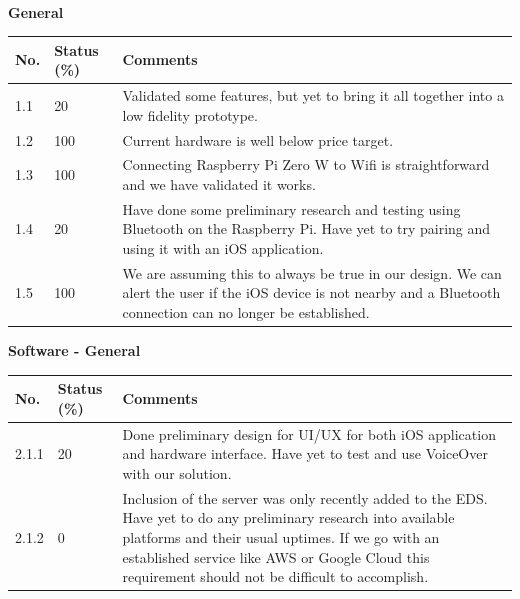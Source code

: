 \documentclass[a4paper,11pt]{article}
\begin{document}
\

\noindent
\textbf{General}
\begin{table}[ht]
    \centering
    \begin{tabular}{|p{0.7cm}|p{1cm}|p{10cm}|}
        \hline
        No. & Status (\%) & Comments \\ \hline
        
        1.1 & 20 & Validated some features, but yet to bring it all together into a low fidelity prototype. \\ \hline
        
        1.2 & 100 & Current hardware is well below price target. \\ \hline
        
        1.3 & 100 & Connecting Raspberry Pi Zero W to Wifi is straightforward and we have validated it works. \\ \hline
        
        1.4 & 20 & Have done some preliminary research and testing using Bluetooth on the Raspberry Pi. Have yet to try pairing and using it with an iOS application. \\ \hline
        
        1.5 & 100 & We are assuming this to always be true in our design. We can alert the user if the iOS device is not nearby and a Bluetooth connection can no longer be established. \\ \hline
    \end{tabular}
\end{table}

\noindent
\textbf{Software - General}
\begin{table}[ht]
    \centering
    \begin{tabular}{|p{0.7cm}|p{1cm}|p{10cm}|}
        \hline
        No. & Status (\%) & Comments \\ \hline
        
        2.1.1 & 20 & Done preliminary design for UI/UX for both iOS application and hardware interface. Have yet to test and use VoiceOver with our solution. \\ \hline
        
        2.1.2 & 0 & Inclusion of the server was only recently added to the EDS. Have yet to do any preliminary research into available platforms and their usual uptimes. If we go with an established service like AWS or Google Cloud this requirement should not be difficult to accomplish. \\ \hline
    \end{tabular}
\end{table}
\end{document}
